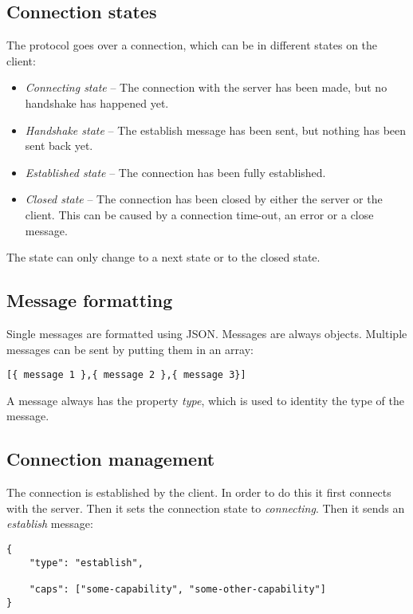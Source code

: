 \documentclass[11pt,a4paper]{article}
\begin{document}
\newpage
\subsection{Connection states}

The protocol goes over a connection, which can be in different states on the client:

\begin{itemize}
\item \textit{Connecting state} -- The connection with the server has been made, but no handshake has happened yet.
\item \textit{Handshake state} -- The establish message has been sent, but nothing has been sent back yet.
\item \textit{Established state} -- The connection has been fully established.
\item \textit{Closed state} -- The connection has been closed by either the server or the client.
This can be caused by a connection time-out, an error or a close message.
\end{itemize}

The state can only change to a next state or to the closed state.

\subsection{Message formatting}

Single messages are formatted using JSON.
Messages are always objects.
Multiple messages can be sent by putting them in an array:

\begin{verbatim}
[{ message 1 },{ message 2 },{ message 3}]
\end{verbatim}

A message always has the property \textit{type}, which is used to identity the type of the message.

\subsection{Connection management}

The connection is established by the client.
In order to do this it first connects with the server.
Then it sets the connection state to \textit{connecting}.
Then it sends an \textit{establish} message:

\begin{verbatim}
{
    "type": "establish",

    "caps": ["some-capability", "some-other-capability"]
}
\end{verbatim}
\end{document}
